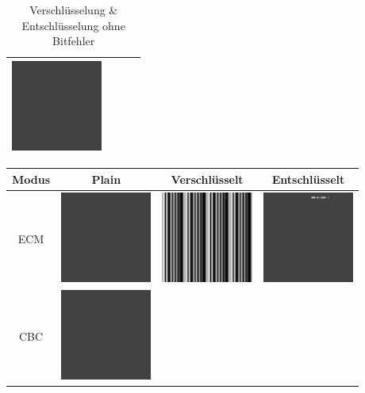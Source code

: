 \begin{table}
\begin{center}
\begin{tabular}{|c|c|c|c|}
        \includegraphics[width=3cm]{img/no_error/output_CBC_decrypt} \\
        \hline
        \end{tabular}   
    \end{center}
    \caption{Verschlüsselung \& Entschlüsselung ohne Bitfehler}
\end{table}
\begin{table}
    \begin{center}
        \begin{tabular}{|c|c|c|c|}
        \hline
        Modus &Plain & Verschlüsselt & Entschlüsselt\\
        \hline
        ECM &
        \includegraphics[width=3cm]{img/error/original} &
        \includegraphics[width=3cm]{img/error/output_ECM} &
        \includegraphics[width=3cm]{img/error/output_ECM_decrypt} \\
        \hline
        CBC &
        \includegraphics[width=3cm]{img/error/original} &

\end{tabular}
\end{center}
\end{table}
